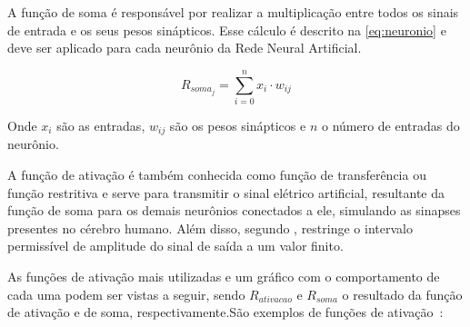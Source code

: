 \documentclass[12pt,oneside,a4paper,chapter=TITLE,section=TITLE,sumario
		=tradicional]{abntex2}
\begin{document}
		\label{sec:func_soma}
		A função de soma é responsável por realizar a multiplicação entre todos os sinais de entrada e os seus pesos sinápticos. Esse cálculo é descrito na \autoref{eq:neuronio} e deve ser aplicado para cada neurônio da Rede Neural Artificial.
		
		\begin{equation}
		\label{eq:neuronio}
		R_{soma_{j}} = \sum_{i = 0}^{n}{x_i \cdot w_{ij}}
		\end{equation}
		
		Onde $x_i$ são as entradas, $w_{ij}$ são os pesos sinápticos e $n$ o número de entradas do neurônio.
		
		
		A função de ativação é também conhecida como função de transferência ou função restritiva e serve para transmitir o sinal elétrico artificial, resultante da função de soma para os demais neurônios conectados a ele, simulando as sinapses presentes no cérebro humano. Além disso, segundo , restringe o intervalo permissível de amplitude do sinal de saída a um valor finito.
		
		As funções de ativação mais utilizadas e um gráfico com o comportamento de cada uma podem ser vistas a seguir, sendo $R_{ativacao}$ e $R_{soma}$ o resultado da função de ativação e de soma, respectivamente.\hspace{0.1cm}São exemplos de funções de ativação~\cite{reis2016}:
		
\end{document}
